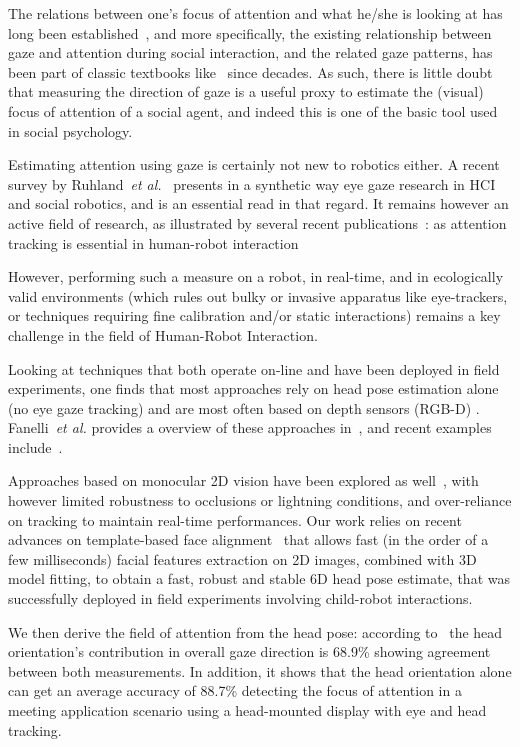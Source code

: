 \documentclass{sig-alternate}
\newcommand{\etal}{\textit{et al.}\xspace}
\begin{document}
The relations between one's focus of attention and what he/she is looking at has
long been established~\cite{yarbus1967eye,barber1976perception}, and more
specifically, the existing relationship between gaze and attention during social
interaction, and the related gaze patterns, has been part of classic textbooks
like~\cite{argyle1969social} since decades. As such, there is little doubt that
measuring the direction of gaze is a useful proxy to estimate the (visual) focus
of attention of a social agent, and indeed this is one of the basic tool used in
social psychology.

Estimating attention using gaze is certainly not new to robotics either. A
recent survey by Ruhland~\etal~\cite{ruhland2015review} presents in a synthetic
way eye gaze research in HCI and social robotics, and is an essential read in
that regard. It remains however an active field of research, as illustrated by
several recent publications~\cite{baxter2014tracking,anzalone,kennedy2015head}:
as attention tracking is essential in human-robot interaction

However, performing such a measure on a robot, in real-time, and in ecologically
valid environments (which rules out bulky or invasive apparatus like
eye-trackers, or techniques requiring fine calibration and/or static
interactions) remains a key challenge in the field of Human-Robot Interaction.

Looking at techniques that both operate on-line and have been deployed in field
experiments, one finds that most approaches rely on head pose estimation alone
(no eye gaze tracking) and are most often based on depth sensors (RGB-D) .
Fanelli~\etal provides a overview of these approaches in~\cite{fanelli2012real},
and recent examples include~\cite{baxter2014tracking, anzalone}.

Approaches based on monocular 2D vision have been explored as
well~\cite{peters2010investigating}, with however limited robustness to
occlusions or lightning conditions, and over-reliance on tracking to maintain
real-time performances.  Our work relies on recent advances on template-based
face alignment~\cite{kazemi2014one} that allows fast (in the order of a few
milliseconds) facial features extraction on 2D images, combined with 3D model
fitting, to obtain a fast, robust and stable 6D head pose estimate, that was
successfully deployed in field experiments involving child-robot interactions.

We then derive the field of attention from the head pose: according
to~\cite{stiefelhagen2002tracking} the head orientation's contribution in
overall gaze direction is 68.9\% showing agreement between both measurements.
In addition, it shows that the head orientation alone can get an average
accuracy of 88.7\% detecting the focus of attention in a meeting application
scenario using a head-mounted display with eye and head tracking.
\end{document}
